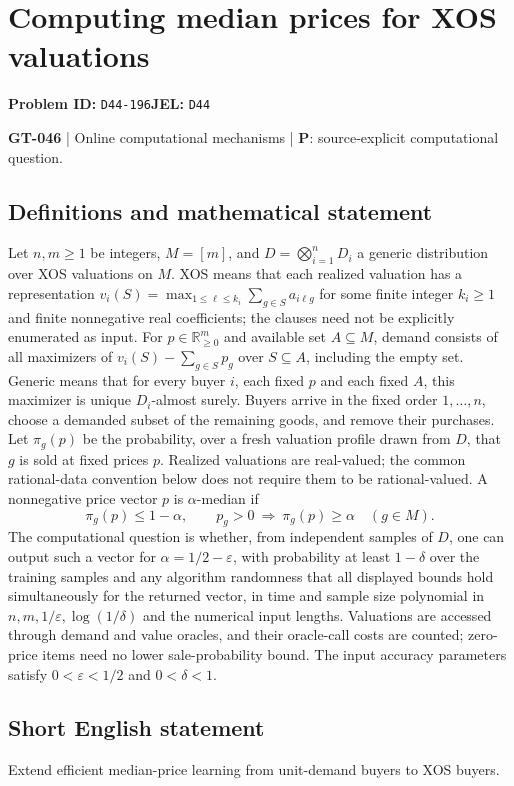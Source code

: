 \documentclass[11pt,a4paper]{article}
\newcommand{\R}{\mathbb R}
\begin{document}
\section*{Computing median prices for XOS valuations}
\textbf{Problem ID:} \texttt{D44-196}\quad \textbf{JEL:} \texttt{D44}\par
\label{problem:OP-0176}
\label{game:GT-046}
{\sffamily\small\color{muted}
\textbf{GT-046} | Online computational mechanisms | \textbf{P}: source-explicit computational question.
\par}
\subsection*{Definitions and mathematical statement}
Let $n,m\geq1$ be integers, $M=[m]$, and $D=\bigotimes_{i=1}^nD_i$ a generic distribution over XOS valuations on $M$. XOS means that each realized valuation has a representation $v_i(S)=\max_{1\leq\ell\leq k_i}\sum_{g\in S}a_{i\ell g}$ for some finite integer $k_i\geq1$ and finite nonnegative real coefficients; the clauses need not be explicitly enumerated as input. For $p\in\R_{\geq0}^m$ and available set $A\subseteq M$, demand consists of all maximizers of $v_i(S)-\sum_{g\in S}p_g$ over $S\subseteq A$, including the empty set. Generic means that for every buyer $i$, each fixed $p$ and each fixed $A$, this maximizer is unique $D_i$-almost surely. Buyers arrive in the fixed order $1,\ldots,n$, choose a demanded subset of the remaining goods, and remove their purchases. Let $\pi_g(p)$ be the probability, over a fresh valuation profile drawn from $D$, that $g$ is sold at fixed prices $p$. Realized valuations are real-valued; the common rational-data convention below does not require them to be rational-valued. A nonnegative price vector $p$ is $\alpha$-median if
\[
 \pi_g(p)\leq1-\alpha,\qquad
 p_g>0\ \Longrightarrow\ \pi_g(p)\geq\alpha
 \quad(g\in M).
\]
The computational question is whether, from independent samples of $D$, one can output such a vector for $\alpha=1/2-\varepsilon$, with probability at least $1-\delta$ over the training samples and any algorithm randomness that all displayed bounds hold simultaneously for the returned vector, in time and sample size polynomial in $n,m,1/\varepsilon,\log(1/\delta)$ and the numerical input lengths. Valuations are accessed through demand and value oracles, and their oracle-call costs are counted; zero-price items need no lower sale-probability bound. The input accuracy parameters satisfy $0<\varepsilon<1/2$ and $0<\delta<1$.
\subsection*{Short English statement}
Extend efficient median-price learning from unit-demand buyers to XOS buyers.
\end{document}
